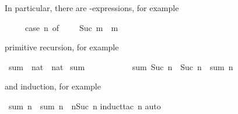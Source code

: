 %
\begin{isabellebody}%
%
\begin{isamarkuptext}%
\noindent
In particular, there are -expressions, for example
%
\begin{isabelle}%
\ \ \ \ \ case\ n\ of\ \ {\isasymRightarrow}\ \ {\isacharbar}\ Suc\ m\ {\isasymRightarrow}\ m%
\end{isabelle}%

primitive recursion, for example%
\end{isamarkuptext}%
\ sum\ {\isacharcolon}{\isacharcolon}\ {\isachardoublequote}nat\ {\isasymRightarrow}\ nat{\isachardoublequote}\isanewline
{}\ {\isachardoublequote}sum\ \ {\isacharequal}\ \isanewline
\ \ \ \ \ \ \ \ {\isachardoublequote}sum\ {\isacharparenleft}Suc\ n{\isacharparenright}\ {\isacharequal}\ Suc\ n\ {\isacharplus}\ sum\ n{\isachardoublequote}%
\begin{isamarkuptext}%
\noindent
and induction, for example%
\end{isamarkuptext}%
\ {\isachardoublequote}sum\ n\ {\isacharplus}\ sum\ n\ {\isacharequal}\ n{\isacharasterisk}{\isacharparenleft}Suc\ n{\isacharparenright}{\isachardoublequote}\isanewline
{}induct{\isacharunderscore}tac\ n{\isacharparenright}\isanewline
{}auto{\isacharparenright}\isanewline
\end{isabellebody}%
